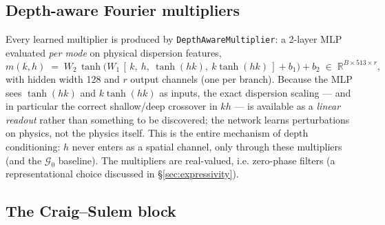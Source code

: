 \documentclass[11pt,letterpaper]{article}
\newcommand{\Gop}{\mathcal{G}}
\begin{document}
\subsection{Depth-aware Fourier multipliers}

Every learned multiplier is produced by \texttt{DepthAwareMultiplier}: a 2-layer
MLP evaluated \emph{per mode} on physical dispersion features,
\[
m(k,h) \;=\; W_2\,\tanh\!\bigl(W_1\,[\,k,\ h,\ \tanh(hk),\ k\tanh(hk)\,] + b_1\bigr) + b_2
\;\in\; \mathbb{R}^{B \times 513 \times r},
\]
with hidden width 128 and $r$ output channels (one per branch). Because the MLP
sees $\tanh(hk)$ and $k\tanh(hk)$ as inputs, the exact dispersion scaling --- and
in particular the correct shallow/deep crossover in $kh$ --- is available as a
\emph{linear readout} rather than something to be discovered; the network learns
perturbations on physics, not the physics itself. This is the entire mechanism
of depth conditioning: $h$ never enters as a spatial channel, only through these
multipliers (and the $\Gop_0$ baseline). The multipliers are real-valued, i.e.
zero-phase filters (a representational choice discussed in \S\ref{sec:expressivity}).

\subsection{The Craig--Sulem block}
\end{document}
